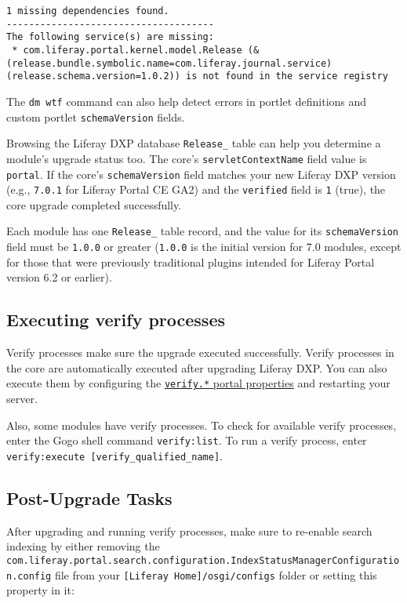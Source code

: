 \begin{verbatim}
1 missing dependencies found.
-------------------------------------
The following service(s) are missing:
 * com.liferay.portal.kernel.model.Release (&(release.bundle.symbolic.name=com.liferay.journal.service)(release.schema.version=1.0.2)) is not found in the service registry
\end{verbatim}

The \texttt{dm\ wtf} command can also help detect errors in portlet
definitions and custom portlet \texttt{schemaVersion} fields.

Browsing the Liferay DXP database \texttt{Release\_} table can help you
determine a module's upgrade status too. The core's
\texttt{servletContextName} field value is \texttt{portal}. If the
core's \texttt{schemaVersion} field matches your new Liferay DXP version
(e.g., \texttt{7.0.1} for Liferay Portal CE GA2) and the
\texttt{verified} field is \texttt{1} (true), the core upgrade completed
successfully.

Each module has one \texttt{Release\_} table record, and the value for
its \texttt{schemaVersion} field must be \texttt{1.0.0} or greater
(\texttt{1.0.0} is the initial version for 7.0 modules, except for those
that were previously traditional plugins intended for Liferay Portal
version 6.2 or earlier).

\subsection{Executing verify
processes}\label{executing-verify-processes}

Verify processes make sure the upgrade executed successfully. Verify
processes in the core are automatically executed after upgrading Liferay
DXP. You can also execute them by configuring the
\href{@platform-ref@/7.0-latest/propertiesdoc/portal.properties.html\#Verify}{\texttt{verify.*}
portal properties} and restarting your server.

Also, some modules have verify processes. To check for available verify
processes, enter the Gogo shell command \texttt{verify:list}. To run a
verify process, enter
\texttt{verify:execute\ {[}verify\_qualified\_name{]}}.

\subsection{Post-Upgrade Tasks}\label{post-upgrade-tasks}

After upgrading and running verify processes, make sure to re-enable
search indexing by either removing the
\texttt{com.liferay.portal.search.configuration.IndexStatusManagerConfiguration.config}
file from your \texttt{{[}Liferay\ Home{]}/osgi/configs} folder or
setting this property in it:

